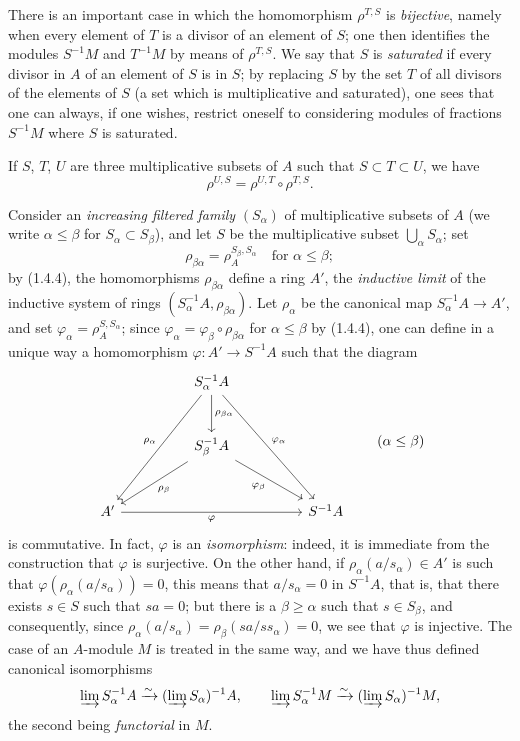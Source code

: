 \begin{env}[1.4.3]
\label{0.1.4.3}
There is an important case in which the homomorphism $\rho^{T,S}$ is \emph{bijective}, namely when every element of $T$ is a divisor of an element of $S$; one then identifies the modules $S^{-1}M$ and $T^{-1}M$ by means of $\rho^{T,S}$.
We say that $S$ is \emph{saturated} if every divisor in $A$ of an element of $S$ is in $S$; by replacing $S$ by the set $T$ of all divisors of the elements of $S$ (a set which is multiplicative and saturated), one sees that one can always, if one wishes, restrict oneself to considering modules of fractions $S^{-1}M$ where $S$ is saturated.
\end{env}

\begin{env}[1.4.4]
\label{0.1.4.4}
If $S$, $T$, $U$ are three multiplicative subsets of $A$ such that $S\subset T\subset U$, we have
\[
  \rho^{U,S}=\rho^{U,T}\circ\rho^{T,S}.
\]
\end{env}

\begin{env}[1.4.5]
\label{0.1.4.5}
Consider an \emph{increasing filtered family} $(S_\alpha)$ of multiplicative subsets of $A$ (we write $\alpha\leq\beta$ for $S_\alpha\subset S_\beta$), and let $S$ be the multiplicative subset $\bigcup_\alpha S_\alpha$; set
\[
  \rho_{\beta\alpha}=\rho_A^{S_\beta,S_\alpha}\quad\text{for }\alpha\leq\beta;
\]
by (1.4.4), the homomorphisms $\rho_{\beta\alpha}$ define a ring $A'$, the \emph{inductive limit} of the inductive system of rings $(S_\alpha^{-1}A,\rho_{\beta\alpha})$.
Let $\rho_\alpha$ be the canonical map $S_\alpha^{-1}A\to A'$, and set $\varphi_\alpha=\rho_A^{S,S_\alpha}$; since $\varphi_\alpha=\varphi_\beta\circ\rho_{\beta\alpha}$ for $\alpha\leq\beta$ by (1.4.4), one can define in a unique way a homomorphism $\varphi:A'\to S^{-1}A$ such that the diagram
\[
\begin{tikzcd}[column sep=huge,row sep=large]
  & S_\alpha^{-1}A
      \arrow[ddl,"\rho_\alpha"']
      \arrow[d,"\rho_{\beta\alpha}"]
      \arrow[ddr,"\varphi_\alpha"] & \\
  & S_\beta^{-1}A
      \arrow[dl,"\rho_\beta"]
      \arrow[dr,"\varphi_\beta"'] & \\
A' \arrow[rr,"\varphi"'] & & S^{-1}A
\end{tikzcd}
\qquad(\alpha\leq\beta)
\]
is commutative.
In fact, $\varphi$ is an \emph{isomorphism}: indeed, it is immediate from the construction that $\varphi$ is surjective.
On the other hand, if $\rho_\alpha(a/s_\alpha)\in A'$ is such that $\varphi(\rho_\alpha(a/s_\alpha))=0$, this means that $a/s_\alpha=0$ in $S^{-1}A$, that is, that there exists $s\in S$ such that $sa=0$; but there is a $\beta\geq\alpha$ such that $s\in S_\beta$, and consequently, since $\rho_\alpha(a/s_\alpha)=\rho_\beta(sa/ss_\alpha)=0$, we see that $\varphi$ is injective.
The case of an $A$-module $M$ is treated in the same way, and we have thus defined canonical isomorphisms
\[
  \varinjlim S_\alpha^{-1}A\xrightarrow{\sim}
  (\varinjlim S_\alpha)^{-1}A,
  \qquad
  \varinjlim S_\alpha^{-1}M\xrightarrow{\sim}
  (\varinjlim S_\alpha)^{-1}M,
\]
the second being \emph{functorial} in $M$.
\end{env}

